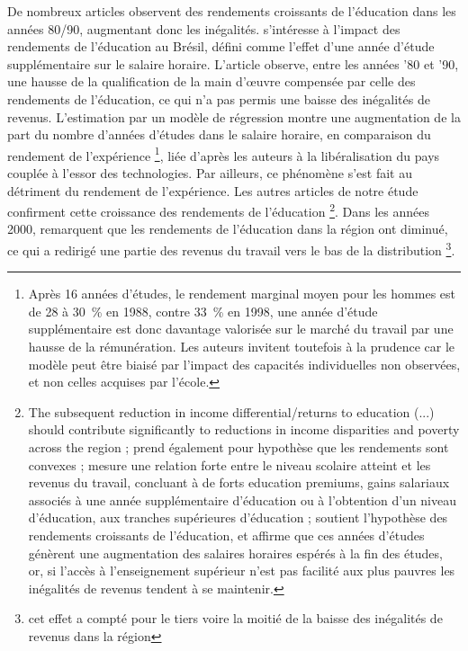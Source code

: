 \documentclass[pagesize, twoside=off, bibliography=totoc, DIV=calc, fontsize=12pt, a4paper, french]{scrartcl}
\begin{document}
De nombreux articles observent des rendements croissants de l’éducation dans les années 80/90, augmentant donc les inégalités.  s’intéresse à l’impact des rendements de l’éducation au Brésil, défini comme l’effet d’une année d’étude supplémentaire sur le salaire horaire. L’article observe, entre les années ’80 et ’90, une hausse de la qualification de la main d’œuvre compensée par celle des rendements de l’éducation, ce qui n’a pas permis une baisse des inégalités de revenus. L’estimation par un modèle de régression montre une augmentation de la part du nombre d’années d’études dans le salaire horaire, en comparaison du rendement de l’expérience \footnote{Après 16 années d'études, le rendement marginal moyen pour les hommes est de 28 à \SI{30}{\percent} en 1988, contre \SI{33}{\percent} en 1998, une année d’étude supplémentaire est donc davantage valorisée sur le marché du travail par une hausse de la rémunération. Les auteurs invitent toutefois à la prudence car le modèle peut être biaisé par l’impact des capacités individuelles non observées, et non celles acquises par l’école.}, liée d’après les auteurs à la libéralisation du pays couplée à l’essor des technologies. Par ailleurs, ce phénomène s’est fait au détriment du rendement de l’expérience. Les autres articles de notre étude confirment cette croissance des rendements de l’éducation \footnote{\og{}The subsequent reduction in income differential/returns to education (...) should contribute significantly to reductions in income disparities and poverty across the region\fg{} \citep{psacharopoulos_poverty_1995}; \citet{ferreira_rise_2008} prend également pour hypothèse que les rendements sont convexes ; \citet{carlson} mesure une relation forte entre le niveau scolaire atteint et les revenus du travail, concluant à de forts \og{}education premiums\fg{}, gains salariaux associés à une année supplémentaire d’éducation ou à l’obtention d’un niveau d’éducation, aux tranches supérieures d’éducation ; \citet{urbina} soutient l’hypothèse des rendements croissants de l’éducation, et affirme que ces années d’études génèrent une augmentation des salaires horaires espérés à la fin des études, or, si l’accès à l’enseignement supérieur n’est pas facilité aux plus pauvres les inégalités de revenus tendent à se maintenir.}. Dans les années 2000, \citet{levy} remarquent que les rendements de l’éducation dans la région ont diminué, ce qui a redirigé une partie des revenus du travail vers le bas de la distribution \footnote{cet effet a compté pour le tiers voire la moitié de la baisse des inégalités de revenus dans la région}. 
\end{document}
